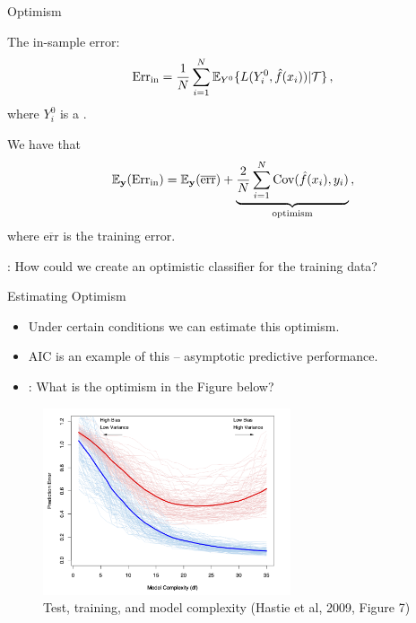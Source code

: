 \documentclass[10pt]{beamer}
\begin{document}

\begin{frame}{Optimism}

The in-sample  error:
\[
\text{Err}_\text{in} = \frac{1}{N}\sum^N_{i=1} \operatorname{\mathbb{E}}_{Y^0}\{L(Y^0_i,\hat{f}(x_i))|\mathcal{T}\}\,,
\]
where $Y^0_i$ is a .\\[3mm]

\pause

We have that
\[
\operatorname{\mathbb{E}}_\mathbf{y} (\text{Err}_\text{in}) = \operatorname{\mathbb{E}}_\mathbf{y}(\overline{\text{err}}) + \underbrace{\frac{2}{N}\sum^N_{i=1} \text{Cov}(\hat{f}(x_i),y_i)}_{\text{optimism}}\,,
\]
where $\overline{\text{err}}$ is the training error.

: How could we create an optimistic classifier for the training data?

\end{frame}

\begin{frame}{Estimating Optimism}

\begin{itemize}
\item Under certain conditions we can estimate this optimism.
\item AIC is an example of this -- asymptotic predictive performance.
\pause
\item {}: What is the optimism in the Figure below?
\end{itemize}


\begin{figure}[h]
\caption{Test, training, and model complexity (Hastie et al, 2009, Figure 7)}
\centering
\includegraphics[width=0.65\textwidth]{figs/ESL_7_1.png}
\end{figure}


\end{frame}
\end{document}

